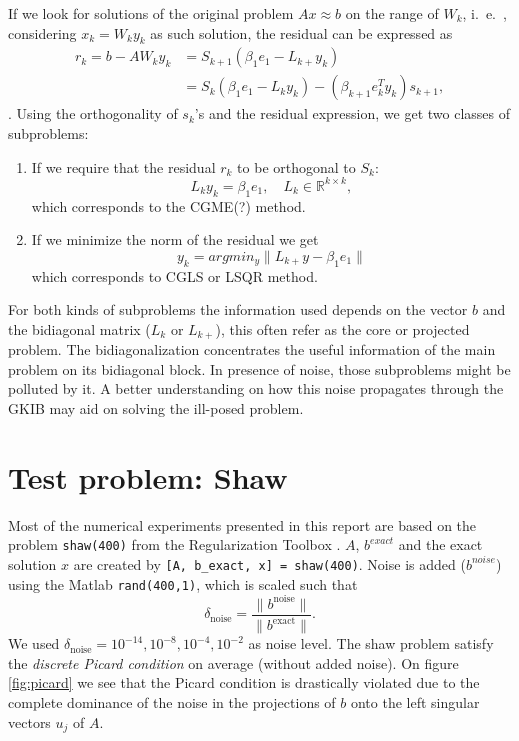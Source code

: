 \documentclass[11pt]{amsart}
\begin{document}
If we look for solutions of the original problem $Ax \approx b$ on the range of
$W_{k}$, i.~e.~, considering $x_{k} = W_{k}y_{k}$ as such solution, the residual
can be expressed as
\begin{align*}
  r_{k} = b - AW_{k}y_{k} &= S_{k+1}(\beta_{1}e_{1} - L_{k+}y_{k}) \\
  &= S_{k}(\beta_{1}e_{1} - L_{k}y_{k}) - 
  (\beta_{k+1}e_{k}^{T}y_{k})s_{k+1},
\end{align*}.
Using the orthogonality of $s_{k}$'s and the residual expression, we get two 
classes of subproblems:
\begin{enumerate}
  \item If we require that the residual $r_{k}$ to be orthogonal to $S_{k}$:
    \begin{equation*}
      L_{k}y_{k} = \beta_{1}e_{1}, \quad L_{k} \in \mathbb{R}^{k \times k},
    \end{equation*}
    which corresponds to the CGME(?) method.
  \item If we minimize the norm of the residual we get
    \begin{equation*}
      y_{k} = argmin_{y}\|L_{k+}y - \beta_{1}e_{1}\|
    \end{equation*}
    which corresponds to CGLS or LSQR method.
\end{enumerate}
For both kinds of subproblems the information used depends on the vector $b$ and
the bidiagonal matrix ($L_{k}$ or $L_{k+}$), this often refer as the core or
projected problem. The bidiagonalization concentrates the useful information of
the main problem on its bidiagonal block. In presence of noise, those
subproblems might be polluted by it. A better understanding on how this noise
propagates through the GKIB may aid on solving the ill-posed problem.

\section{Test problem: Shaw}
Most of the numerical experiments presented in this report are based on the 
problem \texttt{shaw(400)} from the Regularization Toolbox \cite{hansen}. $A$,
$b^{exact}$ and the exact solution $x$ are created by 
\texttt{[A, b\_exact, x] = shaw(400)}. Noise is added ($b^{noise}$) using the
Matlab \texttt{rand(400,1)}, which is scaled such that
\begin{equation*}
  \delta_{\text{noise}} = \frac{\|b^{\text{noise}}\|}{\|b^{\text{exact}}\|}.
\end{equation*}
We used $\delta_{\text{noise}} = 10^{-14}, 10^{-8}, 10^{-4}, 10^{-2}$ as noise level.
The shaw problem satisfy the \emph{discrete Picard condition} on average 
(without added noise). On figure \ref{fig:picard} we see that the Picard 
condition is drastically violated due to the complete dominance of the noise in
the projections of $b$ onto the left singular vectors $u_{j}$ of $A$.
\end{document}
